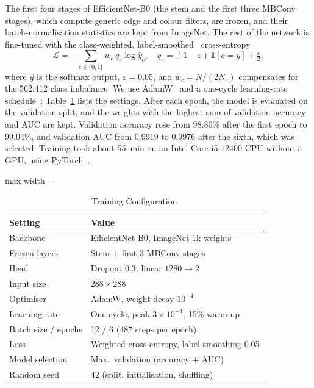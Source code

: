 \documentclass[journal]{IEEEtran}
\begin{document}
The first four stages of EfficientNet-B0 (the stem and the first three MBConv stages),
which compute generic edge and colour filters, are frozen, and their batch-normalisation
statistics are kept from ImageNet. The rest of the network is fine-tuned with the
class-weighted, label-smoothed~\cite{szegedy2016inception} cross-entropy
\begin{equation}
\mathcal{L} = -\sum_{c\in\{0,1\}} w_c\, q_c \log \hat{y}_c, \quad
q_c = (1-\varepsilon)\,\mathbb{1}[c=y] + \tfrac{\varepsilon}{2},
\label{eq:loss}
\end{equation}
where $\hat{y}$ is the softmax output, $\varepsilon=0.05$, and $w_c=N/(2N_c)$ compensates
for the 562:412 class imbalance. We use AdamW~\cite{loshchilov2019adamw} and a one-cycle
learning-rate schedule~\cite{smith2019superconvergence}; Table~\ref{tab:hyper} lists the
settings. After each epoch, the model is evaluated on the validation split, and the
weights with the highest sum of validation accuracy and AUC are kept. Validation accuracy
rose from 98.80\% after the first epoch to 99.04\%, and validation AUC from 0.9919 to
0.9976 after the sixth, which was selected. Training took about 55~min on an Intel Core
i5-12400 CPU without a GPU, using PyTorch~\cite{paszke2019pytorch}.

\begin{table}[!t]
\caption{Training Configuration}
\label{tab:hyper}
\centering
\footnotesize
\setlength{\tabcolsep}{4pt}
\begin{adjustbox}{max width=\columnwidth}
\begin{tabular}{@{}ll@{}}
\toprule
Setting & Value \\
\midrule
Backbone & EfficientNet-B0, ImageNet-1k weights \\
Frozen layers & Stem + first 3 MBConv stages \\
Head & Dropout 0.3, linear $1280\rightarrow2$ \\
Input size & $288\times288$ \\
Optimiser & AdamW, weight decay $10^{-4}$ \\
Learning rate & One-cycle, peak $3\times10^{-4}$, 15\% warm-up \\
Batch size / epochs & 12 / 6 (487 steps per epoch) \\
Loss & Weighted cross-entropy, label smoothing 0.05 \\
Model selection & Max.\ validation (accuracy + AUC) \\
Random seed & 42 (split, initialisation, shuffling) \\
\bottomrule
\end{tabular}
\end{adjustbox}
\end{table}
\end{document}
